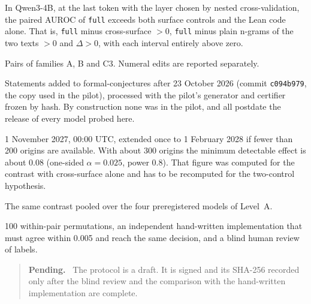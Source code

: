 \documentclass[10pt]{article}
\newcommand{\vr}[1]{\texttt{#1}}
\newcommand{\D}{\Delta}
\newenvironment{pendiente}{\begin{quote}\small\noindent\textbf{Pending.}\ }{\end{quote}}
\begin{document}
\begin{description}[leftmargin=1.2em]
\item[Hypothesis] In Qwen3-4B, at the last token with the layer chosen by nested cross-validation, the paired
AUROC of \vr{full} exceeds both surface controls and the Lean code alone. That is, \vr{full} minus cross-surface $> 0$, \vr{full} minus plain n-grams of the two texts $> 0$ and $\D > 0$, with each interval entirely above zero.
\item[Population] Pairs of families A, B and C3. Numeral edits are reported separately.
\item[Data] Statements added to formal-conjectures after 23 October 2026 (commit \vr{c094b979}, the copy used in the pilot),
processed with the pilot's generator and certifier frozen by hash. By construction none was in the pilot, and all
postdate the release of every model probed here.
\item[Snapshot] 1 November 2027, 00:00 UTC, extended once to 1 February 2028 if fewer than 200 origins are
available. With about 300 origins the minimum detectable effect is about 0.08 (one-sided $\alpha = 0.025$, power
0.8). That figure was computed for the contrast with cross-surface alone and has to be recomputed for the
two-control hypothesis.
\item[Replication] The same contrast pooled over the four preregistered models of Level~A.
\item[Checks] 100 within-pair permutations, an independent hand-written implementation that must agree within
0.005 and reach the same decision, and a blind human review of labels.
\end{description}

\begin{pendiente}
The protocol is a draft. It is signed and its SHA-256 recorded only after the blind review and the comparison with
the hand-written implementation are complete.
\end{pendiente}

\end{document}
